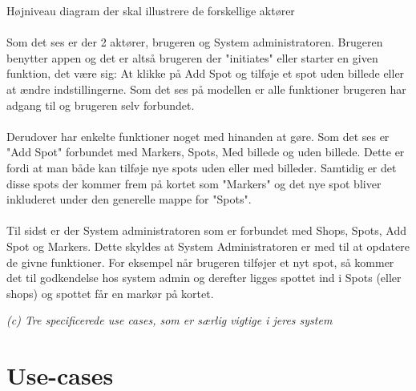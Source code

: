 \documentclass[12pt]{article}
\begin{document}
Højniveau diagram der skal illustrere de forskellige aktører\\\\
Som det ses er der 2 aktører, brugeren og System administratoren. Brugeren benytter appen og det er altså brugeren der "initiates" eller starter en given funktion, det være sig: At klikke på Add Spot og tilføje et spot uden billede eller at ændre indstillingerne. Som det ses på modellen er alle funktioner brugeren har adgang til og brugeren selv forbundet.\\\\ Derudover har enkelte funktioner noget med hinanden at gøre. Som det ses er "Add Spot" forbundet med Markers, Spots, Med billede og uden billede. Dette er fordi at man både kan tilføje nye spots uden eller med billeder. Samtidig er det disse spots der kommer frem på kortet som "Markers" og det nye spot bliver inkluderet under den generelle mappe for "Spots".\\\\
Til sidst er der System administratoren som er forbundet med Shops, Spots, Add Spot og Markers. Dette skyldes at System Administratoren er med til at opdatere de givne funktioner. For eksempel når brugeren tilføjer et nyt spot, så kommer det til godkendelse hos system admin og derefter ligges spottet ind i Spots (eller shops) og spottet får en markør på kortet.

\pagebreak
\textit{(c) Tre specificerede use cases, som er særlig vigtige i jeres system}\\
\setlength\parindent{0pt}
\section*{Use-cases}
\end{document}

